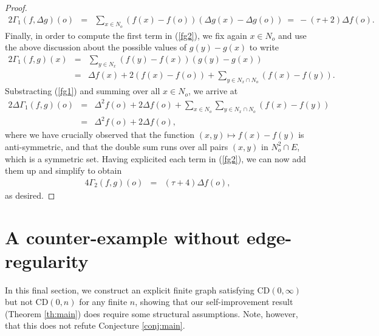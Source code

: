 \documentclass[10pt,a4paper]{amsart}
\newcommand{\CD}{\mathrm{CD}}
\begin{document}
\begin{proof}
\begin{eqnarray}
2\Gamma_1(f,\Delta g)(o) & = & \sum_{x\in N_o}\left(f(x)-f(o)\right)\left(\Delta g(x)-\Delta g(o)\right) \ = \ -(\tau+2)\Delta f(o).
\end{eqnarray}
Finally, in order to compute the first term in (\ref{fg2}), we fix again $x\in N_o$ and use the above discussion about the possible values of $g(y)-g(x)$ to write 
\begin{eqnarray*}
2\Gamma_1(f,g)(x) & = & \sum_{y\in N_x}\left(f(y)-f(x)\right)\left(g(y)-g(x)\right)\\
 & = & \Delta f(x)+2\left(f(x)-f(o)\right)+\sum_{y\in N_x\cap N_o}\left(f(x)-f(y)\right).
\end{eqnarray*}
Substracting (\ref{fg1}) and summing over all $x\in N_o$, we arrive at
 \begin{eqnarray*}
2\Delta\Gamma_1(f,g)(o) 
& = & \Delta^2f(o)+2\Delta f(o)+\sum_{x\in N_o}\sum_{y\in N_x\cap N_o}\left(f(x)-f(y)\right)\\
& = & \Delta^2f(o)+2\Delta f(o),
\end{eqnarray*}
where we have crucially observed that the function $(x,y)\mapsto f(x)-f(y)$  is anti-symmetric, and that the double sum runs over all pairs $(x,y)$ in $N_o^2\cap E$, which is a symmetric set. Having explicited each term in (\ref{fg2}), we can now add them up and simplify to obtain
\begin{eqnarray}
4\Gamma_2(f,g)(o) 
& = & (\tau+4)\Delta f(o),
\end{eqnarray}
as desired. 
\end{proof}
\section{A counter-example without edge-regularity}
\label{sec:counterexample}
In this final section, we construct an explicit finite graph satisfying  $\CD(0,\infty)$ but not $\CD(0,n)$ for any finite $n$, showing that our self-improvement result (Theorem \ref{th:main}) does require some structural assumptions. Note, however, that this does not refute Conjecture \ref{conj:main}.
\end{document}
